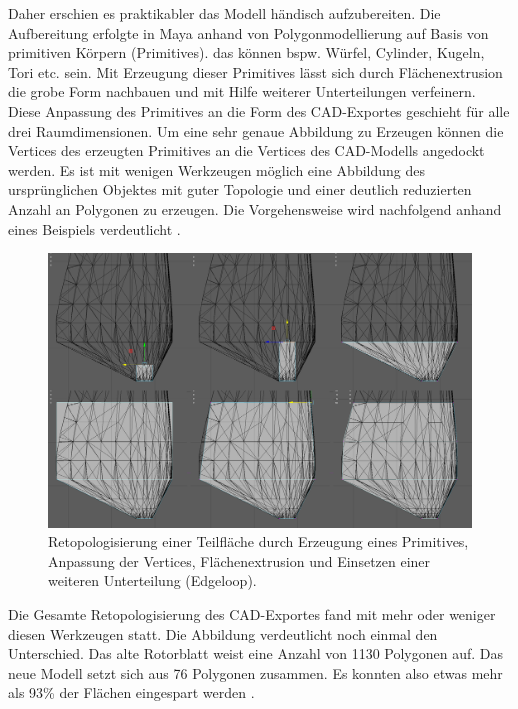 Daher erschien es praktikabler das Modell händisch aufzubereiten. Die Aufbereitung erfolgte in Maya anhand von Polygonmodellierung auf Basis von primitiven Körpern (Primitives). das können bspw. Würfel, Cylinder, Kugeln, Tori etc. sein.  Mit Erzeugung dieser Primitives lässt sich durch Flächenextrusion die grobe Form nachbauen und mit Hilfe weiterer Unterteilungen verfeinern. Diese Anpassung des Primitives an die Form des CAD-Exportes geschieht für alle drei Raumdimensionen. Um eine sehr genaue Abbildung zu Erzeugen können die Vertices des erzeugten Primitives an die Vertices des CAD-Modells \glqq angedockt\grqq\, werden. Es ist mit wenigen Werkzeugen möglich eine Abbildung des ursprünglichen Objektes mit guter Topologie und einer deutlich reduzierten Anzahl an Polygonen zu erzeugen. Die Vorgehensweise wird nachfolgend anhand eines Beispiels verdeutlicht .

\begin{figure}[H]
	\centering
	\captionsetup{width=1\textwidth}
	\includegraphics[keepaspectratio, width=1\textwidth]{bildquellen/mod}
	\caption{Retopologisierung einer Teilfläche durch Erzeugung eines Primitives, Anpassung der Vertices, Flächenextrusion und Einsetzen einer weiteren Unterteilung (Edgeloop).}
	\label{fig:2.5}
\end{figure}
 \clearpage
Die Gesamte Retopologisierung des CAD-Exportes fand mit mehr oder weniger diesen Werkzeugen statt. Die Abbildung verdeutlicht noch einmal den Unterschied. Das alte Rotorblatt weist eine Anzahl von 1130 Polygonen auf. Das neue Modell setzt sich aus 76 Polygonen zusammen. Es konnten also etwas mehr als 93\% der Flächen eingespart werden . 

